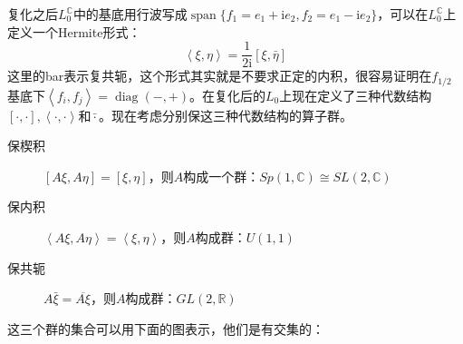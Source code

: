 复化之后$L_0^\mathbb{C}$中的基底用行波写成$\operatorname{span}\{f_1=e_1+\mathrm{i}e_2,f_2=e_1-\mathrm{i}e_2\}$，可以在$L_0^\mathbb{C}$上定义一个Hermite形式：
\begin{equation}
	\left< \xi,\eta\right>=\frac{1}{2\mathrm{i}}\left[\xi,\bar \eta\right]
\end{equation}
这里的bar表示复共轭，这个形式其实就是不要求正定的内积，很容易证明在$f_{1/2}$基底下$\left< f_i,f_j\right>=\operatorname{diag}(-,+)$。在复化后的$L_0$上现在定义了三种代数结构$[\cdot,\cdot],\left<\cdot,\cdot\right>$和$\bar\cdot$。现在考虑分别保这三种代数结构的算子群。
\begin{description}
	\item[保楔积] $[A\xi,A\eta]=[\xi,\eta]$，则$A$构成一个群：$Sp(1,\mathbb{C})\cong SL(2,\mathbb{C})$\\
	\item[保内积] $\left< A\xi,A\eta\right>=\left<\xi,\eta\right>$，则$A$构成群：$U(1,1)$\\
	\item[保共轭] $A\bar\xi=\overline{A\xi}$，则$A$构成群：$GL(2,\mathbb{R})$
\end{description}
这三个群的集合可以用下面的图表示，他们是有交集的：
\begin{figure}[H]
	\centering
\end{figure}
